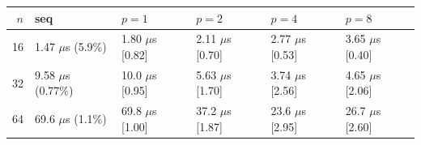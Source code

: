 \begin{tabular}{rlllll}
\toprule
$n$ & seq & $p{=}1$ & $p{=}2$ & $p{=}4$ & $p{=}8$ \\
\midrule
16 & 1.47 $\mu$s (5.9\%) & 1.80 $\mu$s [0.82] & 2.11 $\mu$s [0.70] & 2.77 $\mu$s [0.53] & 3.65 $\mu$s [0.40] \\
32 & 9.58 $\mu$s (0.77\%) & 10.0 $\mu$s [0.95] & 5.63 $\mu$s [1.70] & 3.74 $\mu$s [2.56] & 4.65 $\mu$s [2.06] \\
64 & 69.6 $\mu$s (1.1\%) & 69.8 $\mu$s [1.00] & 37.2 $\mu$s [1.87] & 23.6 $\mu$s [2.95] & 26.7 $\mu$s [2.60] \\
\bottomrule
\end{tabular}
